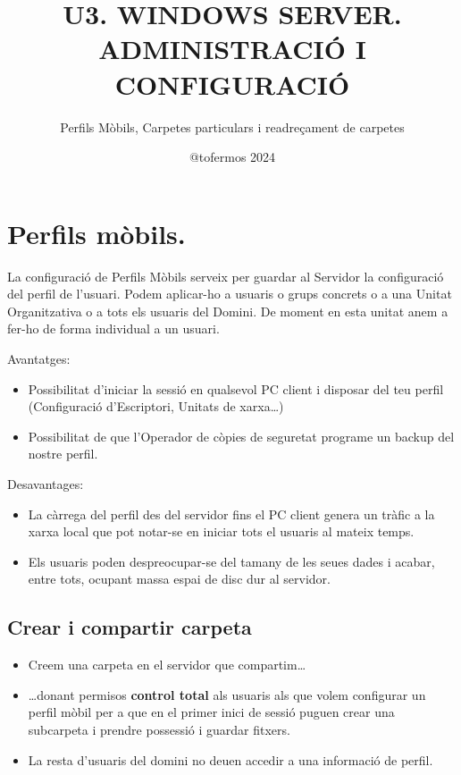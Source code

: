 \documentclass[
  a4paper,
]{article}
\title{U3. WINDOWS SERVER. ADMINISTRACIÓ I CONFIGURACIÓ}
\subtitle{Perfils Mòbils, Carpetes particulars i readreçament de
carpetes}
\author{@tofermos 2024}
\date{}
\begin{document}
\maketitle

{
\setcounter{tocdepth}{2}
\tableofcontents
}
\newpage
\renewcommand\tablename{Tabla}

\section{Perfils mòbils.}\label{perfils-muxf2bils.}

La configuració de Perfils Mòbils serveix per guardar al Servidor la
configuració del perfil de l'usuari. Podem aplicar-ho a usuaris o grups
concrets o a una Unitat Organitzativa o a tots els usuaris del Domini.
De moment en esta unitat anem a fer-ho de forma individual a un usuari.

Avantatges:

\begin{itemize}
\item
  Possibilitat d'iniciar la sessió en qualsevol PC client i disposar del
  teu perfil (Configuració d'Escriptori, Unitats de xarxa\ldots)
\item
  Possibilitat de que l'Operador de còpies de seguretat programe un
  backup del nostre perfil.
\end{itemize}

Desavantages:

\begin{itemize}
\item
  La càrrega del perfil des del servidor fins el PC client genera un
  tràfic a la xarxa local que pot notar-se en iniciar tots el usuaris al
  mateix temps.
\item
  Els usuaris poden despreocupar-se del tamany de les seues dades i
  acabar, entre tots, ocupant massa espai de disc dur al servidor.
\end{itemize}

\subsection{Crear i compartir carpeta}\label{crear-i-compartir-carpeta}

\begin{itemize}
\item
  Creem una carpeta en el servidor que compartim\ldots{}
\item
  \ldots donant permisos \textbf{control total} als usuaris als que
  volem configurar un perfil mòbil per a que en el primer inici de
  sessió puguen crear una subcarpeta i prendre possessió i guardar
  fitxers.
\item
  La resta d'usuaris del domini no deuen accedir a una informació de
  perfil.
\end{itemize}
\end{document}
